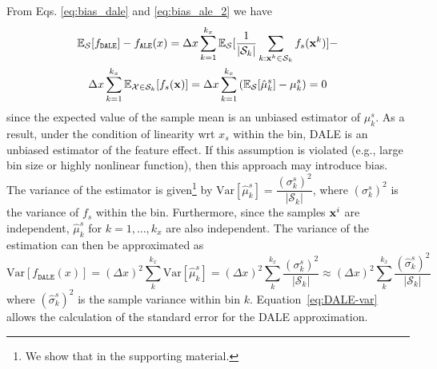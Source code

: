 \noindent
From Eqs. \eqref{eq:bias_dale} and \eqref{eq:bias_ale_2} we have
\begin{multline}
    \mathbb{E}_{\mathcal{S}}[f_{\mathtt{DALE}}]  - f_{\mathtt{ALE}}(x) =
    \Delta x\sum_{k=1}^{k_x}\mathbb{E}_{\mathcal{S}}[\frac{1}{|\mathcal{S}_k|}\sum_{k:\mathbf{x}^k \in
        \mathcal{S}_k} f_s(\mathbf{x}^k)] - \\
    \Delta x\sum_{k=1}^{k_x}\mathbb{E}_{\mathcal{X}\in \mathcal{S}_k}[f_s(\mathbf{x})] = 
  \Delta x\sum_{k=1}^{k_x}\left(\mathbb{E}_{\mathcal{S}}[\hat{\mu}_k^s] - \mu_k^s\right) = 0
\end{multline}
since the expected value of the sample mean is an unbiased estimator
of \(\mu_k^s\). As a result, under the condition of linearity wrt
\(x_s\) within the bin, DALE is an unbiased estimator of the feature
effect. If this assumption is violated (e.g., large bin size or highly
nonlinear function), then this approach may introduce bias. The
variance of the estimator is given\footnote{We show that in the
  supporting material.} by
\( \mathrm{Var}[\hat{\mu}_k^s] =
\dfrac{(\sigma_k^s)^2}{|\mathcal{S}_k|} \), where \((\sigma_k^s)^2\)
is the variance of \(f_s\) within the bin. Furthermore, since the
samples \(\mathbf{x}^i\) are independent, \(\hat{\mu}_k^s\) for
\(k=1,\dotsc,k_x\) are also independent. The variance of the
estimation can then be approximated as
%
\begin{equation}
  \mathrm{Var}[f_{\mathtt{DALE}}(x)] = (\Delta x)^2\sum_k^{k_x} \mathrm{Var} [\hat{\mu}_k^s] 
  = (\Delta x)^2 \sum_k^{k_x}  \dfrac{(\sigma_k^s)^2}{|\mathcal{S}_k|} \approx
  (\Delta x)^2 \sum_k^{k_x}  \dfrac{(\hat{\sigma}_k^s)^2}{|\mathcal{S}_k|}
  \label{eq:DALE-var}
\end{equation}
%
where \((\hat{\sigma}_k^s)^2\) is the sample variance within bin
\(k\). Equation~\eqref{eq:DALE-var} allows the calculation of the
standard error for the DALE approximation.
